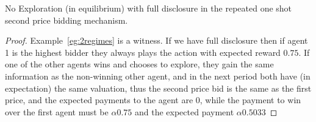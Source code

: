 \begin{lem}
No Exploration (in equilibrium) with full disclosure in the repeated one shot second price bidding mechanism.
\end{lem}

\begin{proof}
Example~\ref{eg:2regimes} is a witness. If we have full disclosure then if agent 1 is the highest bidder they always plays the action with expected reward $0.75$. If one of the other agents wins and chooses to explore, they gain the same information as the non-winning other agent, and in the next period both have (in expectation) the same valuation, thus the second price bid is the same as the first price, and the expected payments to the agent are 0, while the payment to win over the first agent must be $\alpha 0.75$ and the expected payment $\alpha 0.5033$
\end{proof}













